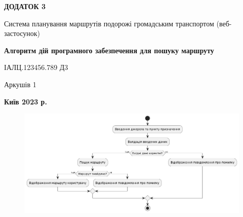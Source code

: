 \clearpage
\begin{center}
{\fontsize{18}{22}\selectfont
\textbf{\uppercase{Додаток 3}}
}

{\fontsize{16}{29}\selectfont
\bigbreak
\bigbreak
Система планування маршрутів подорожі громадським транспортом (веб-
застосунок)
}

\vspace*{\fill}

{\fontsize{18}{22}\selectfont
\textbf{Алгоритм дій програмного забезпечення для пошуку маршруту}

ІАЛЦ.123456.789 Д3
}

\vfill

{\fontsize{16}{29}\selectfont
Аркушів 1
}
\vfill %

\textbf{Київ 2023 р.}
\end{center}
\clearpage

\vspace*{\fill}
\begin{figure}[!htp]
    \centering
    \includegraphics[scale=0.5]{content/applications/assets/img/route_search_diagram.png}
    \label{fig:app-3}
\end{figure}
\vfill